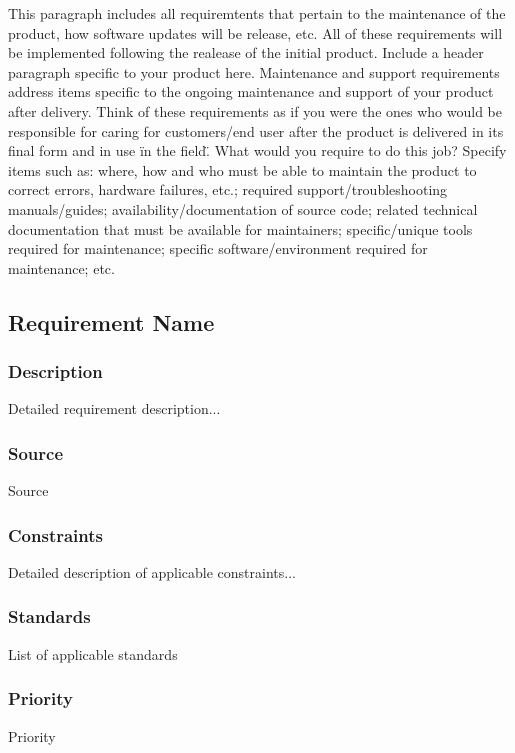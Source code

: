This paragraph includes all requiremtents that pertain to the maintenance of the product, how software updates will be release, etc. All of these requirements will be implemented following the realease of the initial product. 
Include a header paragraph specific to your product here. Maintenance and support requirements address items specific to the ongoing maintenance and support of your product after delivery. Think of these requirements as if you were the ones who would be responsible for caring for customers/end user after the product is delivered in its final form and in use \"in the field\". What would you require to do this job? Specify items such as: where, how and who must be able to maintain the product to correct errors, hardware failures, etc.; required support/troubleshooting manuals/guides; availability/documentation of source code; related technical documentation that must be available for maintainers; specific/unique tools required for maintenance; specific software/environment required for maintenance; etc.

\subsection{Requirement Name}
\subsubsection{Description}
Detailed requirement description...
\subsubsection{Source}
Source
\subsubsection{Constraints}
Detailed description of applicable constraints...
\subsubsection{Standards}
List of applicable standards
\subsubsection{Priority}
Priority
